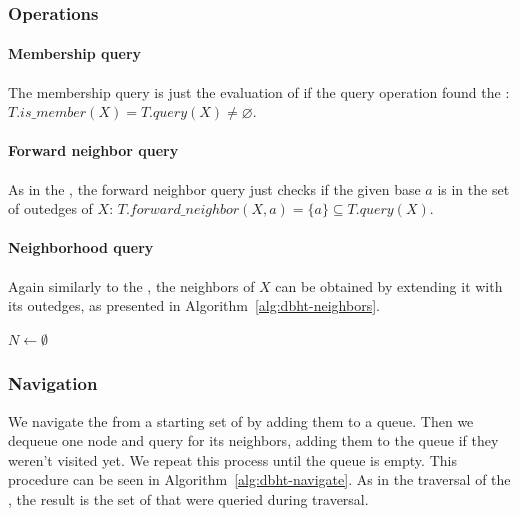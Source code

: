 \subsubsection{Operations}

\paragraph{Membership query} The membership query is just the evaluation of if the query operation found the \kmer: $T.\mathit{is\_member}(X) = T.\mathit{query}(X) \neq \varnothing$.

\paragraph{Forward neighbor query} As in the \dBCM, the forward neighbor query just checks if the given base $a$ is in the set of outedges of $X$: $T.\mathit{forward\_neighbor}(X, a) = \{a\} \subseteq T.\mathit{query}(X)$.

\paragraph{Neighborhood query} Again similarly to the \dBCM, the neighbors of $X$ can be obtained by extending it with its outedges, as presented in Algorithm~\ref{alg:dbht-neighbors}.

\begin{algorithm}
	\caption{$T.\mathit{neighbors}(X)$}\label{alg:dbht-neighbors}
  $N \gets \emptyset$\\
\end{algorithm}

\subsubsection{Navigation}

We navigate the \dBHT from a starting set of   by adding them to a queue. Then we dequeue one node and query for its neighbors, adding them to the queue if they weren't visited yet. We repeat this process until the queue is empty. This procedure can be seen in Algorithm~\ref{alg:dbht-navigate}. As in the traversal of the \dBCM, the result is the set of  that were queried during traversal.

